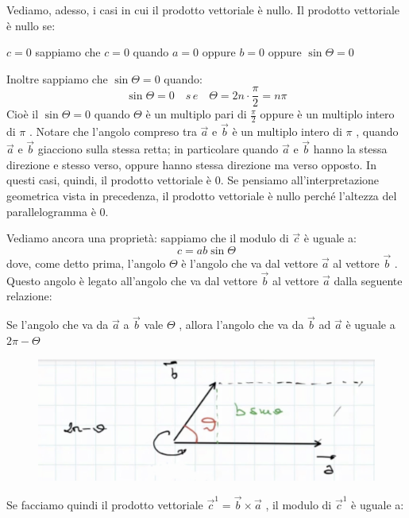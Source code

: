 Vediamo, adesso, i casi in cui il prodotto vettoriale è nullo.
Il prodotto vettoriale è nullo se:

$ c = 0 $ sappiamo che $ c = 0 $ quando $ a = 0 $ oppure $ b = 0 $ oppure $ \sin \Theta = 0 $

Inoltre sappiamo che $ \sin \Theta = 0 $ quando: 
$$ \sin \Theta = 0 \quad s\,e \quad \Theta = 2n \cdot \frac{\pi}{2} = n\pi $$
Cioè il $ \sin \Theta = 0 $ quando $ \Theta $ è un multiplo pari di $ \frac{\pi}{2} $ oppure è un multiplo intero di $ \pi $ . Notare che l'angolo compreso tra $ \overrightarrow{a} $ e $ \overrightarrow{b} $ è un multiplo intero di $ \pi $ , quando $\overrightarrow{a} $ e $ \overrightarrow{b} $ giacciono sulla stessa retta; in particolare quando $ \overrightarrow{a} $ e $ \overrightarrow{b} $ hanno la stessa direzione e stesso verso, oppure hanno stessa direzione ma verso opposto. In questi casi, quindi, il prodotto vettoriale è 0. Se pensiamo all'interpretazione geometrica vista in precedenza, il prodotto vettoriale è nullo perché l'altezza del parallelogramma è 0.

Vediamo ancora una proprietà: sappiamo che il modulo di $ \overrightarrow{c} $ è uguale a:
$$ c = ab \sin \Theta  $$
dove, come detto prima, l'angolo $ \Theta $ è l'angolo che va dal vettore $ \overrightarrow{a} $ al vettore $ \overrightarrow{b} $ . Questo angolo è legato all'angolo che va dal vettore $ \overrightarrow{b} $ al vettore $ \overrightarrow{a} $ dalla seguente relazione:
\newpage

Se l'angolo che va da $ \overrightarrow{a} $ a $ \overrightarrow{b} $ vale $ \Theta $ , allora l'angolo  che va da $ \overrightarrow{b} $ ad $ \overrightarrow{a} $ è uguale a $ 2 \pi - \Theta $

\begin{figure}[h]
\begin{center}
\includegraphics[width = 0.5 \textwidth]{lezione1/images/vettoriale4}
\label{fig:vettoriale4}
\end{center}
\end{figure}

Se facciamo quindi il prodotto vettoriale $ \overrightarrow{c}^{1} =  \overrightarrow{b} \times \overrightarrow{a} $ , il modulo di $\overrightarrow{c}^{1} $  è uguale a:

